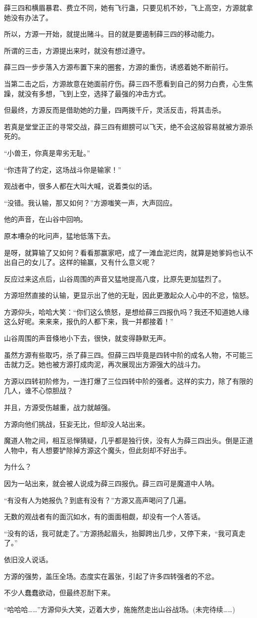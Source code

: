 \begin{this_body}
薛三四和横眉暴君、费立不同，她有飞行蛊，只要见机不妙，飞上高空，方源就拿她没有办法了。

所以，方源一开始，就提出赌斗。目的就是要遏制薛三四的移动能力。

所谓的三击，方源提出来时，就没有想过遵守。

薛三四一步步落入方源布置下来的圈套，方源的重伤，诱惑着她不断前行。

当第二击之后，方源故意在她面前疗伤。薛三四不愿看到自己的努力白费，心生焦躁，就没有多想，飞到上空，选择了最强的冲击方式。

但最终，方源反而是借助她的力量，四两拨千斤，灵活反击，将其击杀。

若真是堂堂正正的寻常交战，薛三四有翅膀可以飞天，绝不会这般容易就被方源杀死的。

“小兽王，你真是卑劣无耻。”

“你违背了约定，这场战斗你是输家！”

观战者中，很多人都在大叫大喊，说着类似的话。

“没错。我认输，那又如何？”方源嗤笑一声，大声回应。

他的声音，在山谷中回响。

原本嘈杂的叱问声，猛地低落下去。

是呀，就算输了又如何？看看那赢家吧，成了一滩血泥烂肉，就算是她爹妈也认不出自己的女儿了。这样的输赢，又有什么意义呢？

反应过来这点后，山谷周围的声音又猛地提高八度，比原先更加猛烈了。

方源坦然直接的认输，更显示出了他的无耻，因此更激起众人心中的不忿，恼怒。

方源仰头，哈哈大笑：“你们这么愤怒，是想给薛三四报仇吗？我还不知道她人缘这么好呢。来来来，报仇的人都下来，我一并都接着！”

山谷周围的声音倏地小下去，很快，就变得静默无声。

虽然方源有些取巧，杀了薛三四。但薛三四毕竟是四转中阶的成名人物，不可能三击就力乏。她也被方源打成肉泥，再次展现出方源强大的战斗力。

方源以四转初阶修为，一连打爆了三位四转中阶的强者。这样的实力，除了有限的几人，谁不心惊胆战？

并且，方源受伤越重，战力就越强。

方源向他们挑战，狂妄无比，但却没人站出来。

魔道人物之间，相互忌惮猜疑，几乎都是独行侠，没有人为薛三四出头。倒是正道人物中，有人想要铲除掉方源这个魔头，但此刻却不好出手。

为什么？

因为一站出来，就会被人说成为薛三四报仇。薛三四可是魔道中人呐。

“有没有人为她报仇？到底有没有？”方源又高声喝问了几遍。

无数的观战者有的面沉如水，有的面面相觑，却没有一个人答话。

“没有的话，我可就走了。”方源扬起眉头，抬脚跨出几步，又停下来，“我可真走了。”

依旧没人说话。

方源的强势，盖压全场。态度实在嚣张，引起了许多四转强者的不忿。

不少人蠢蠢欲动，但最终忍耐下来。

“哈哈哈……”方源仰头大笑，迈着大步，施施然走出山谷战场。(未完待续……)

\end{this_body}


